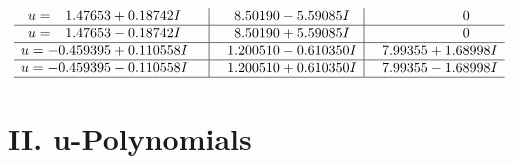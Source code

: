 \documentclass[1p]{elsarticle_modified}
\theoremstyle{definition}
\begin{document}
$$\begin{array}{c|c|c}
\begin{aligned}
u &= \phantom{-}1.47653 + 0.18742 I\end{aligned}
 & \phantom{-}8.50190 - 5.59085 I & \phantom{-0.000000 } 0 \\ \hline\begin{aligned}
u &= \phantom{-}1.47653 - 0.18742 I\end{aligned}
 & \phantom{-}8.50190 + 5.59085 I & \phantom{-0.000000 } 0 \\ \hline\begin{aligned}
u &= -0.459395 + 0.110558 I\end{aligned}
 & \phantom{-}1.200510 - 0.610350 I & \phantom{-}7.99355 + 1.68998 I \\ \hline\begin{aligned}
u &= -0.459395 - 0.110558 I\end{aligned}
 & \phantom{-}1.200510 + 0.610350 I & \phantom{-}7.99355 - 1.68998 I\\
 \hline 
 \end{array}$$\newpage
\newpage\renewcommand{\arraystretch}{1}
\centering \section*{ II. u-Polynomials}
\end{document}

